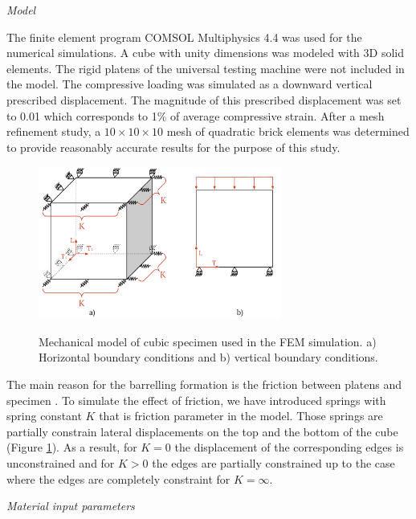 \documentclass[review]{elsarticle}
\begin{document}
\begin{description}
\item{\textit{Model}}
\end{description}





The finite element program COMSOL Multiphysics 4.4 \cite{Comsol} was used for
the numerical simulations.
A cube with unity dimensions was modeled with
3D solid elements.
The rigid platens of the universal testing machine were not included in the
model.
The compressive loading was simulated as a downward vertical prescribed
displacement. The magnitude of this prescribed displacement was set to 0.01
which corresponds to  1\%  of average compressive strain.
After a mesh refinement study, a $10\times10\times10$ mesh of quadratic brick
elements was determined to provide reasonably accurate results for the purpose of this study.

\begin{figure}[h]
\centering
\includegraphics[width=8cm]{BarellingPaper.pdf}
\label{fig:Barrelling}
\caption{\label{fig:Barrelling} Mechanical model of cubic
specimen used in the FEM simulation. 
a) Horizontal boundary conditions and b) vertical boundary conditions.}
\end{figure}

The main reason for the barrelling formation is the friction between platens
and specimen \cite{Narayanasamy198821, kulkarni1969}. To simulate the effect of
friction, we have introduced springs with spring constant $K$ that is friction parameter
in the model. Those springs are partially constrain lateral displacements
on the top and the bottom of the cube (Figure \ref{fig:Barrelling}).  
As a result, for $K=0$ the displacement of the corresponding
edges is unconstrained and for $K>0$ the edges are partially constrained up to
the case where the edges are completely constraint for $K=\infty$.

\begin{description}
\item{\textit{Material input parameters}}
\end{description}
\end{document}
